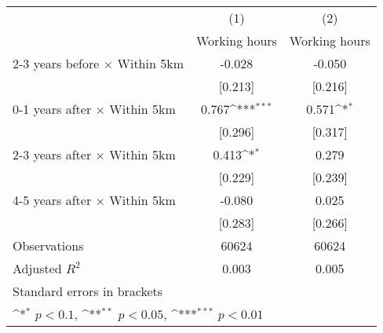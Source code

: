 {
\def\sym#1{\ifmmode^{#1}\else\(^{#1}\)\fi}
\begin{tabular}{l*{2}{c}}
\hline\hline
                    &\multicolumn{1}{c}{(1)}&\multicolumn{1}{c}{(2)}\\
                    &\multicolumn{1}{c}{Working hours}&\multicolumn{1}{c}{Working hours}\\
\hline
2-3 years before $\times$ Within 5km&      -0.028         &      -0.050         \\
                    &     [0.213]         &     [0.216]         \\
0-1 years after $\times$ Within 5km&       0.767\sym{***}&       0.571\sym{*}  \\
                    &     [0.296]         &     [0.317]         \\
2-3 years after $\times$ Within 5km&       0.413\sym{*}  &       0.279         \\
                    &     [0.229]         &     [0.239]         \\
4-5 years after $\times$ Within 5km&      -0.080         &       0.025         \\
                    &     [0.283]         &     [0.266]         \\
\hline
Observations        &       60624         &       60624         \\
Adjusted \(R^{2}\)  &       0.003         &       0.005         \\
\hline\hline
\multicolumn{3}{l}{\footnotesize Standard errors in brackets}\\
\multicolumn{3}{l}{\footnotesize \sym{*} \(p<0.1\), \sym{**} \(p<0.05\), \sym{***} \(p<0.01\)}\\
\end{tabular}
}
